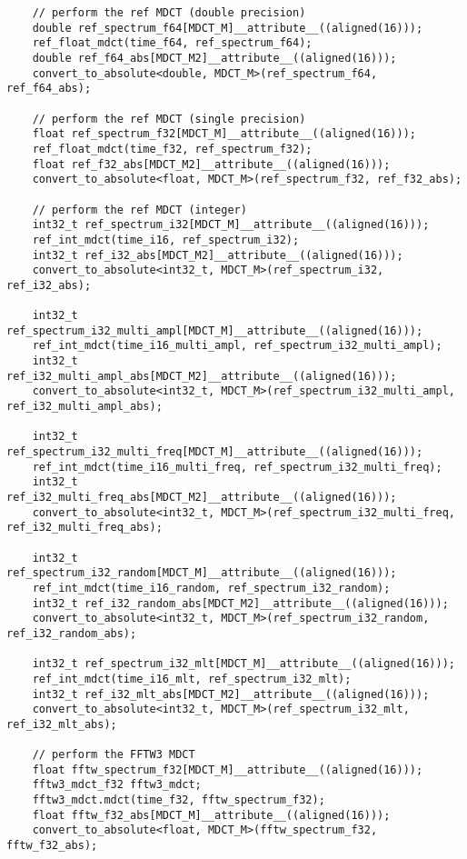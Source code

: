 \documentclass{article}
\begin{document}
\begin{lstlisting}
    // perform the ref MDCT (double precision)
    double ref_spectrum_f64[MDCT_M]__attribute__((aligned(16)));
    ref_float_mdct(time_f64, ref_spectrum_f64);
    double ref_f64_abs[MDCT_M2]__attribute__((aligned(16)));
    convert_to_absolute<double, MDCT_M>(ref_spectrum_f64, ref_f64_abs);

    // perform the ref MDCT (single precision)
    float ref_spectrum_f32[MDCT_M]__attribute__((aligned(16)));
    ref_float_mdct(time_f32, ref_spectrum_f32);
    float ref_f32_abs[MDCT_M2]__attribute__((aligned(16)));
    convert_to_absolute<float, MDCT_M>(ref_spectrum_f32, ref_f32_abs);

    // perform the ref MDCT (integer)
    int32_t ref_spectrum_i32[MDCT_M]__attribute__((aligned(16)));
    ref_int_mdct(time_i16, ref_spectrum_i32);
    int32_t ref_i32_abs[MDCT_M2]__attribute__((aligned(16)));
    convert_to_absolute<int32_t, MDCT_M>(ref_spectrum_i32, ref_i32_abs);

    int32_t ref_spectrum_i32_multi_ampl[MDCT_M]__attribute__((aligned(16)));
    ref_int_mdct(time_i16_multi_ampl, ref_spectrum_i32_multi_ampl);
    int32_t ref_i32_multi_ampl_abs[MDCT_M2]__attribute__((aligned(16)));
    convert_to_absolute<int32_t, MDCT_M>(ref_spectrum_i32_multi_ampl, ref_i32_multi_ampl_abs);

    int32_t ref_spectrum_i32_multi_freq[MDCT_M]__attribute__((aligned(16)));
    ref_int_mdct(time_i16_multi_freq, ref_spectrum_i32_multi_freq);
    int32_t ref_i32_multi_freq_abs[MDCT_M2]__attribute__((aligned(16)));
    convert_to_absolute<int32_t, MDCT_M>(ref_spectrum_i32_multi_freq, ref_i32_multi_freq_abs);

    int32_t ref_spectrum_i32_random[MDCT_M]__attribute__((aligned(16)));
    ref_int_mdct(time_i16_random, ref_spectrum_i32_random);
    int32_t ref_i32_random_abs[MDCT_M2]__attribute__((aligned(16)));
    convert_to_absolute<int32_t, MDCT_M>(ref_spectrum_i32_random, ref_i32_random_abs);

    int32_t ref_spectrum_i32_mlt[MDCT_M]__attribute__((aligned(16)));
    ref_int_mdct(time_i16_mlt, ref_spectrum_i32_mlt);
    int32_t ref_i32_mlt_abs[MDCT_M2]__attribute__((aligned(16)));
    convert_to_absolute<int32_t, MDCT_M>(ref_spectrum_i32_mlt, ref_i32_mlt_abs);

    // perform the FFTW3 MDCT
    float fftw_spectrum_f32[MDCT_M]__attribute__((aligned(16)));
    fftw3_mdct_f32 fftw3_mdct;
    fftw3_mdct.mdct(time_f32, fftw_spectrum_f32);
    float fftw_f32_abs[MDCT_M]__attribute__((aligned(16)));
    convert_to_absolute<float, MDCT_M>(fftw_spectrum_f32, fftw_f32_abs);


\end{lstlisting}
\end{document}
